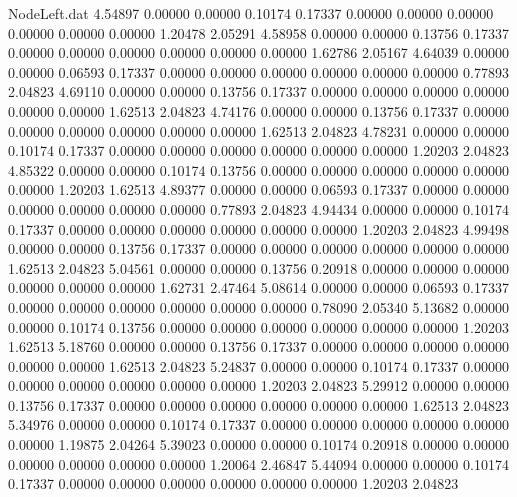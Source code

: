 \begin{filecontents}{NodeLeft.dat}
   4.54897    0.00000    0.00000     0.10174    0.17337    0.00000    0.00000    0.00000    0.00000    0.00000    0.00000    1.20478    2.05291
   4.58958    0.00000    0.00000     0.13756    0.17337    0.00000    0.00000    0.00000    0.00000    0.00000    0.00000    1.62786    2.05167
   4.64039    0.00000    0.00000     0.06593    0.17337    0.00000    0.00000    0.00000    0.00000    0.00000    0.00000    0.77893    2.04823
   4.69110    0.00000    0.00000     0.13756    0.17337    0.00000    0.00000    0.00000    0.00000    0.00000    0.00000    1.62513    2.04823
   4.74176    0.00000    0.00000     0.13756    0.17337    0.00000    0.00000    0.00000    0.00000    0.00000    0.00000    1.62513    2.04823
   4.78231    0.00000    0.00000     0.10174    0.17337    0.00000    0.00000    0.00000    0.00000    0.00000    0.00000    1.20203    2.04823
   4.85322    0.00000    0.00000     0.10174    0.13756    0.00000    0.00000    0.00000    0.00000    0.00000    0.00000    1.20203    1.62513
   4.89377    0.00000    0.00000     0.06593    0.17337    0.00000    0.00000    0.00000    0.00000    0.00000    0.00000    0.77893    2.04823
   4.94434    0.00000    0.00000     0.10174    0.17337    0.00000    0.00000    0.00000    0.00000    0.00000    0.00000    1.20203    2.04823
   4.99498    0.00000    0.00000     0.13756    0.17337    0.00000    0.00000    0.00000    0.00000    0.00000    0.00000    1.62513    2.04823
   5.04561    0.00000    0.00000     0.13756    0.20918    0.00000    0.00000    0.00000    0.00000    0.00000    0.00000    1.62731    2.47464
   5.08614    0.00000    0.00000     0.06593    0.17337    0.00000    0.00000    0.00000    0.00000    0.00000    0.00000    0.78090    2.05340
   5.13682    0.00000    0.00000     0.10174    0.13756    0.00000    0.00000    0.00000    0.00000    0.00000    0.00000    1.20203    1.62513
   5.18760    0.00000    0.00000     0.13756    0.17337    0.00000    0.00000    0.00000    0.00000    0.00000    0.00000    1.62513    2.04823
   5.24837    0.00000    0.00000     0.10174    0.17337    0.00000    0.00000    0.00000    0.00000    0.00000    0.00000    1.20203    2.04823
   5.29912    0.00000    0.00000     0.13756    0.17337    0.00000    0.00000    0.00000    0.00000    0.00000    0.00000    1.62513    2.04823
   5.34976    0.00000    0.00000     0.10174    0.17337    0.00000    0.00000    0.00000    0.00000    0.00000    0.00000    1.19875    2.04264
   5.39023    0.00000    0.00000     0.10174    0.20918    0.00000    0.00000    0.00000    0.00000    0.00000    0.00000    1.20064    2.46847
   5.44094    0.00000    0.00000     0.10174    0.17337    0.00000    0.00000    0.00000    0.00000    0.00000    0.00000    1.20203    2.04823

\end{filecontents}
